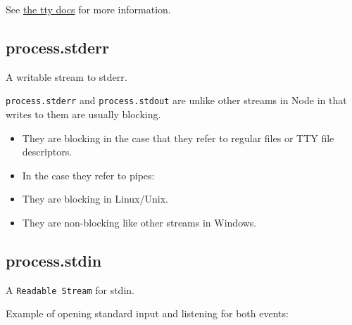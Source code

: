 See \href{tty.html\#tty_tty}{the tty docs} for more information.

\subsection{process.stderr}\label{process.stderr}

A writable stream to stderr.

\texttt{process.stderr} and \texttt{process.stdout} are unlike other
streams in Node in that writes to them are usually blocking.

\begin{itemize}
\itemsep1pt\parskip0pt
\item
  They are blocking in the case that they refer to regular files or TTY
  file descriptors.
\item
  In the case they refer to pipes:
\item
  They are blocking in Linux/Unix.
\item
  They are non-blocking like other streams in Windows.
\end{itemize}

\subsection{process.stdin}\label{process.stdin}

A \texttt{Readable Stream} for stdin.

Example of opening standard input and listening for both events:

\begin{Shaded}
\begin{Highlighting}[]
\NormalTok{(}\NormalTok{);}

\NormalTok{(}\NormalTok{, }\NormalTok{() \{}
   \NormalTok{();}
   \NormalTok{) \{}
    \NormalTok{(} 
  \NormalTok{\}}
\NormalTok{\});}

\NormalTok{(}\NormalTok{, }\NormalTok{() \{}
  \NormalTok{(}\NormalTok{);}
\NormalTok{\});}
\end{Highlighting}
\end{Shaded}

